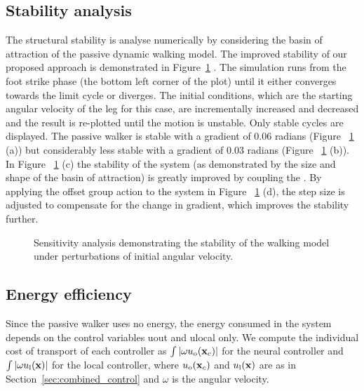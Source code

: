 \subsection{Stability analysis}

The structural stability is analyse numerically by considering the basin of attraction of the passive dynamic walking model.
The improved stability of our proposed approach is demonstrated in Figure~\ref{fig:boa_plot} . 
The simulation runs from the foot strike phase (the bottom left corner of the plot) until it either converges towards the limit cycle or diverges.
The initial conditions, which are the starting angular velocity of the leg for this case, are incrementally increased and decreased and the result is re-plotted until the motion is unstable. 
Only stable cycles are displayed.
The passive walker is stable with a gradient of 0.06 radians (Figure ~\ref{fig:boa_plot} (a)) but considerably less stable with a gradient of 0.03 radians (Figure ~\ref{fig:boa_plot} (b)). 
In Figure ~\ref{fig:boa_plot} (c) the stability of the system (as demonstrated by the size and shape of the basin of attraction) is greatly improved by coupling the \cpg. 
By applying the offset group action to the system in Figure ~\ref{fig:boa_plot} (d), the step size is adjusted to compensate for the change in gradient, which improves the stability further.

\begin{figure}[htbp]
\centering
{}
\caption{\label{fig:boa_plot}Sensitivity analysis demonstrating the stability of the walking model under perturbations of initial angular velocity.}
\end{figure}

 
\subsection{Energy efficiency}
Since the passive walker uses no energy, the energy consumed in the system depends on the control variables uout  and ulocal only. 
We compute the individual cost of transport \citep{collins05a} of each controller as $\int|\omega u_{\mathrm{o}}(\mathbf{x}_c)|$ for the neural controller and $\int|\omega u_{\mathrm{l}}(\mathbf{x})|$ for the local controller, where $u_{\mathrm{o}}(\mathbf{x}_c)$ and $u_{\mathrm{l}}(\mathbf{x})$ are as in Section~\ref{sec:combined_control} and $\omega$ is the angular velocity. 

